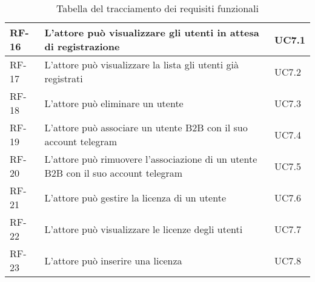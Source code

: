 \begin{table}
\begin{tabular}{ |p{2cm}|p{8cm}|p{2cm}| }
 \hline
   RF-16     & L'attore può visualizzare gli utenti in attesa di registrazione   & UC7.1 \\
\hline
RF-17   & L'attore può visualizzare la lista gli utenti già registrati   & UC7.2 \\
\hline
RF-18   & L'attore può eliminare un utente  & UC7.3 \\
\hline
RF-19   &  L'attore può associare un utente B2B con il suo account telegram  & UC7.4 \\
\hline
RF-20  &  L'attore può rimuovere l'associazione di un utente B2B con il suo account telegram & UC7.5 \\
\hline
RF-21   &  L'attore può gestire la licenza di un utente  & UC7.6 \\
\hline
RF-22   &  L'attore può visualizzare le licenze degli utenti & UC7.7 \\
\hline
RF-23   & L'attore può inserire una  licenza  & UC7.8 \\
\hline
\end{tabular}
\\\\
\caption{Tabella del tracciamento dei requisiti funzionali}
\end{table}

\clearpage


